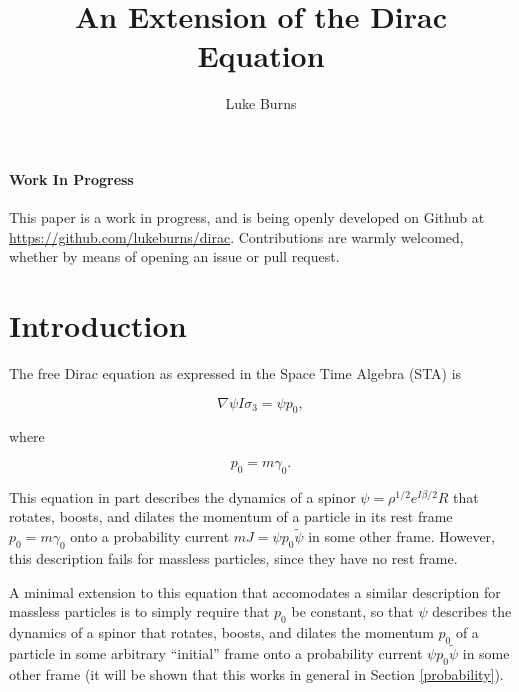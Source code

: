 \documentclass{article}
\title{An Extension of the Dirac Equation}
\author{Luke Burns}
\begin{document}
  \maketitle


  \paragraph{Work In Progress} This paper is a work in progress, and is being openly developed on Github at \url{https://github.com/lukeburns/dirac}. Contributions are warmly welcomed, whether by means of opening an issue or pull request.

  \section{Introduction}

  The free Dirac equation as expressed in the Space Time Algebra (STA) is\cite{gap}

  \begin{equation}
    \nabla \psi I \sigma_3 = \psi p_0, \label{eq:dirac}
  \end{equation}

  where

  \begin{equation}
    p_0 = m \gamma_0. \label{eq:mass}
  \end{equation} 

  This equation in part describes the dynamics of a spinor $\psi = \rho^{1/2} e^{I \beta/2}R$ that rotates, boosts, and dilates the momentum of a particle in its rest frame $p_0 = m \gamma_0$ onto a probability current $mJ = \psi p_0 \widetilde \psi$ in some other frame. However, this description fails for massless particles, since they have no rest frame.

  A minimal extension to this equation that accomodates a similar description for massless particles is to simply require that $p_0$ be constant, so that $\psi$ describes the dynamics of a spinor that rotates, boosts, and dilates the momentum $p_0$ of a particle in some arbitrary ``initial'' frame onto a probability current $\psi p_0 \widetilde \psi$ in some other frame (it will be shown that this works in general in Section \ref{probability}).
\end{document}
